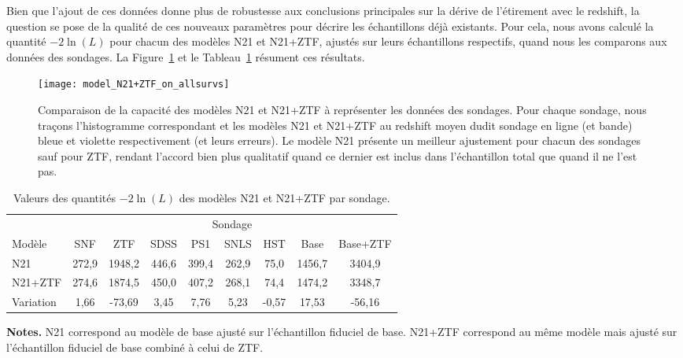 \documentclass[../main/main.tex]{subfiles}
\begin{document}
Bien que l'ajout de ces données donne plus de robustesse aux conclusions
principales sur la dérive de l'étirement avec le redshift, la question se pose
de la qualité de ces nouveaux paramètres pour décrire les échantillons déjà
existants. Pour cela, nous avons calculé la quantité $-2\ln(L)$ pour chacun des
modèles N21 et N21+ZTF, ajustés sur leurs échantillons respectifs, quand nous les
comparons aux données des sondages. La Figure~\ref{fig:bzcomp} et le
Tableau~\ref{tab:bzcomp} résument ces résultats.

\begin{figure}[ht]
    \centerfloat
    \texttt{[image: model\_N21+ZTF\_on\_allsurvs]}
    \caption[Comparaison de la capacité des modèles N21 et N21+ZTF à représenter
    les données des sondages]{Comparaison de la capacité des modèles N21 et
    N21+ZTF à représenter les données des sondages. Pour chaque sondage, nous
traçons l'histogramme correspondant et les modèles N21 et N21+ZTF au redshift
moyen dudit sondage en ligne (et bande) bleue et violette respectivement (et
leurs erreurs). Le modèle N21 présente un meilleur ajustement pour chacun des
sondages sauf pour ZTF, rendant l'accord bien plus qualitatif quand ce dernier
est inclus dans l'échantillon total que quand il ne l'est pas.}
    \label{fig:bzcomp}
\end{figure}

\begin{table}[ht]
    \centering
    \begin{threeparttable}
        \caption[Capacité des modèles N21 et N21+ZTF à représenter les
        données]{Valeurs des quantités $-2\ln(L)$ des modèles N21 et N21+ZTF par
        sondage.}
        \label{tab:bzcomp}
        \begin{tabular}{lcccccccc}
            \toprule
            & \multicolumn{8}{c}{Sondage}\\
            \cmidrule(lr){2-9}
            Modèle & SNF & ZTF & SDSS & PS1 & SNLS & HST & Base & Base+ZTF\\
            \midrule
            N21 &
            272,9 & 1948,2 & 446,6 & 399,4 & 262,9 & 75,0 & 1456,7 & 3404,9\\
            N21+ZTF & 
            274,6 & 1874,5 & 450,0 & 407,2 & 268,1 & 74,4 & 1474,2 & 3348,7\\
            Variation &
            1,66 & -73,69 & 3,45 & 7,76 & 5,23 & -0,57 & 17,53 & -56,16\\
            \bottomrule
        \end{tabular}
        \begin{tablenotes}[flushleft]
        \item\small \textbf{\hspace{-3.2pt}Notes.} N21 correspond au modèle de
            base ajusté sur l'échantillon fiduciel de base. N21+ZTF correspond
            au même modèle mais ajusté sur l'échantillon fiduciel de base
            combiné à celui de ZTF.
        \end{tablenotes}
    \end{threeparttable}
\end{table}
\end{document}
